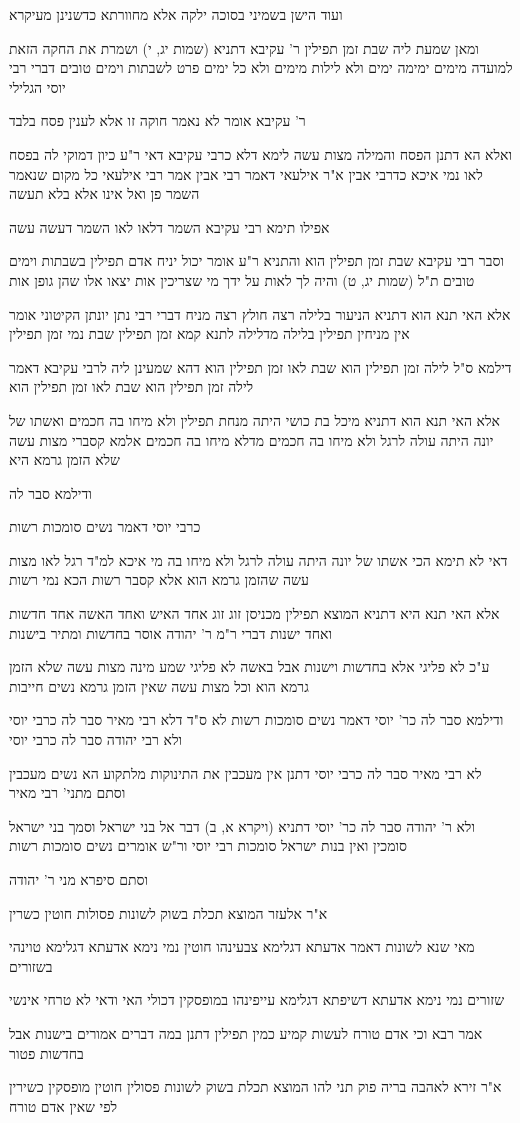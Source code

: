 \documentclass[12pt, openany]{book}
\newcommand{\sethebfont}{
\fontsize{10.5pt}{21.0pt} \selectfont
}
\newcommand{\textblock}[1]{
{\sethebfont #1\\}	
}
\begin{document}
\textblock{ועוד הישן בשמיני בסוכה ילקה אלא מחוורתא כדשנינן מעיקרא}
\textblock{ומאן שמעת ליה שבת זמן תפילין ר' עקיבא דתניא (שמות יג, י) ושמרת את החקה הזאת למועדה מימים ימימה ימים ולא לילות מימים ולא כל ימים פרט לשבתות וימים טובים דברי רבי יוסי הגלילי}
\textblock{ר' עקיבא אומר לא נאמר חוקה זו אלא לענין פסח בלבד}
\textblock{ואלא הא דתנן הפסח והמילה מצות עשה לימא דלא כרבי עקיבא דאי ר"ע כיון דמוקי לה בפסח לאו נמי איכא כדרבי אבין א"ר אילעאי דאמר רבי אבין אמר רבי אילעאי כל מקום שנאמר השמר פן ואל אינו אלא בלא תעשה}
\textblock{אפילו תימא רבי עקיבא השמר דלאו לאו השמר דעשה עשה}
\textblock{וסבר רבי עקיבא שבת זמן תפילין הוא והתניא ר"ע אומר יכול יניח אדם תפילין בשבתות וימים טובים ת"ל (שמות יג, ט) והיה לך לאות על ידך מי שצריכין אות יצאו אלו שהן גופן אות}
\textblock{אלא האי תנא הוא דתניא הניעור בלילה רצה חולץ רצה מניח דברי רבי נתן יונתן הקיטוני אומר אין מניחין תפילין בלילה מדלילה לתנא קמא זמן תפילין שבת נמי זמן תפילין}
\textblock{דילמא ס"ל לילה זמן תפילין הוא שבת לאו זמן תפילין הוא דהא שמעינן ליה לרבי עקיבא דאמר לילה זמן תפילין הוא שבת לאו זמן תפילין הוא}
\textblock{אלא האי תנא הוא דתניא מיכל בת כושי היתה מנחת תפילין ולא מיחו בה חכמים ואשתו של יונה היתה עולה לרגל ולא מיחו בה חכמים מדלא מיחו בה חכמים אלמא קסברי מצות עשה שלא הזמן גרמא היא}
\textblock{ודילמא סבר לה}
\textblock{כרבי יוסי דאמר נשים סומכות רשות}
\textblock{דאי לא תימא הכי אשתו של יונה היתה עולה לרגל ולא מיחו בה מי איכא למ"ד רגל לאו מצות עשה שהזמן גרמא הוא אלא קסבר רשות הכא נמי רשות}
\textblock{אלא האי תנא היא דתניא המוצא תפילין מכניסן זוג זוג אחד האיש ואחד האשה אחד חדשות ואחד ישנות דברי ר"מ ר' יהודה אוסר בחדשות ומתיר בישנות}
\textblock{ע"כ לא פליגי אלא בחדשות וישנות אבל באשה לא פליגי שמע מינה מצות עשה שלא הזמן גרמא הוא וכל מצות עשה שאין הזמן גרמא נשים חייבות}
\textblock{ודילמא סבר לה כר' יוסי דאמר נשים סומכות רשות לא ס"ד דלא רבי מאיר סבר לה כרבי יוסי ולא רבי יהודה סבר לה כרבי יוסי}
\textblock{לא רבי מאיר סבר לה כרבי יוסי דתנן אין מעכבין את התינוקות מלתקוע הא נשים מעכבין וסתם מתני' רבי מאיר}
\textblock{ולא ר' יהודה סבר לה כר' יוסי דתניא (ויקרא א, ב) דבר אל בני ישראל וסמך בני ישראל סומכין ואין בנות ישראל סומכות רבי יוסי ור"ש אומרים נשים סומכות רשות}
\textblock{וסתם סיפרא מני ר' יהודה}
\textblock{א"ר אלעזר המוצא תכלת בשוק לשונות פסולות חוטין כשרין}
\textblock{מאי שנא לשונות דאמר אדעתא דגלימא צבעינהו חוטין נמי נימא אדעתא דגלימא טוינהי בשזורים}
\textblock{שזורים נמי נימא אדעתא דשיפתא דגלימא עייפינהו במופסקין דכולי האי ודאי לא טרחי אינשי}
\textblock{אמר רבא וכי אדם טורח לעשות קמיע כמין תפילין דתנן במה דברים אמורים בישנות אבל בחדשות פטור}
\textblock{א"ר זירא לאהבה בריה פוק תני להו המוצא תכלת בשוק לשונות פסולין חוטין מופסקין כשירין לפי שאין אדם טורח}
\end{document}
